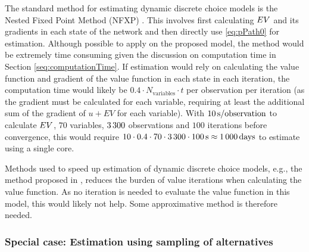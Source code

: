 The standard method for estimating dynamic discrete choice models is the Nested Fixed Point Method (NFXP) \citep{RustML88}. This involves first calculating $EV$ and its gradients in each state of the network and then directly use \eqref{eq:pPath0} for estimation. Although possible to apply on the proposed model, the method would be extremely time consuming given the discussion on computation time in Section \ref{seq:computationTime}. If estimation would rely on calculating the value function and gradient of the value function in each state in each iteration, the computation time would likely be $0.4\cdot N_{\text{variables}} \cdot t$ per observation per iteration (as the gradient must be calculated for each variable, requiring at least the additional sum of the gradient of $u + EV$ for each variable). With $10\, \mathrm{s/observation}$ to calculate $EV$, $70$ variables, $3\, 300$ observations and $100$ iterations before convergence, this would require $10 \cdot 0.4 \cdot  70 \cdot 3\, 300 \cdot 100 \, \mathrm{s} \approx 1\, 000 \, \mathrm{days}$ to estimate using a single core. 

Methods used to speed up estimation of dynamic discrete choice models, e.g., the method proposed in \citet{aguirregabiria2002swapping}, reduces the burden of value iterations when calculating the value function. As no iteration is needed to evaluate the value function in this model, this would likely not help. Some approximative method is therefore needed.

\subsubsection{Special case: Estimation using sampling of alternatives}
\label{sec:estSampling}

% 

